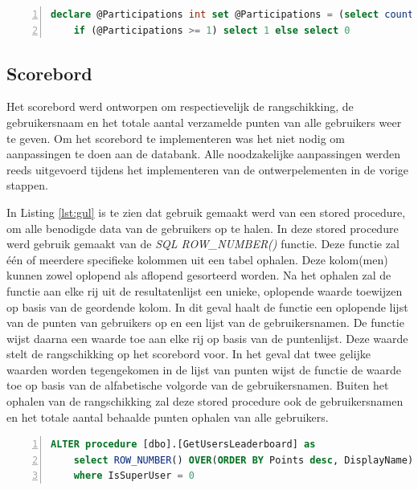 \begin{lstlisting}[caption={De trigger query van een badge.},
    label={lst:tq},
    language=SQL,
    showspaces=false,
    basicstyle=\ttfamily,
    numbers=left,
    numberstyle=\tiny,
    numbersep=1pt,
    breaklines=true
    commentstyle=\color{gray}]
    declare @Participations int set @Participations = (select count(*) from QuestionBot_Participations where UserID = @UserID) 
    if (@Participations >= 1) select 1 else select 0
\end{lstlisting}

\subsection{Scorebord}

Het scorebord werd ontworpen om respectievelijk de rangschikking, de gebruikersnaam en het totale aantal verzamelde punten van alle gebruikers weer te geven. Om het scorebord te implementeren was het niet nodig om aanpassingen te doen aan de databank. Alle noodzakelijke aanpassingen werden reeds uitgevoerd tijdens het implementeren van de ontwerpelementen in de vorige stappen.

In Listing \ref{lst:gul} is te zien dat gebruik gemaakt werd van een stored procedure, om alle benodigde data van de gebruikers op te halen. In deze stored procedure werd gebruik gemaakt van de \textit{SQL ROW\_NUMBER()} functie. Deze functie zal één of meerdere specifieke kolommen uit een tabel ophalen. Deze kolom(men) kunnen zowel oplopend als aflopend gesorteerd worden. Na het ophalen zal de functie aan elke rij uit de resultatenlijst een unieke, oplopende waarde toewijzen op basis van de geordende kolom. In dit geval haalt de functie een oplopende lijst van de punten van gebruikers op en een lijst van de gebruikersnamen. De functie wijst daarna een waarde toe aan elke rij op basis van de puntenlijst. Deze waarde stelt de rangschikking op het scorebord voor. In het geval dat twee gelijke waarden worden tegengekomen in de lijst van punten wijst de functie de waarde toe op basis van de alfabetische volgorde van de gebruikersnamen. Buiten het ophalen van de rangschikking zal deze stored procedure ook de gebruikersnamen en het totale aantal behaalde punten ophalen van alle gebruikers.

\begin{lstlisting}[caption={De GetUsersLeaderboard stored procedure.},
    label={lst:gul},
    language=SQL,
    showspaces=false,
    basicstyle=\ttfamily,
    numbers=left,
    numberstyle=\tiny,
    numbersep=1pt,
    breaklines=true
    commentstyle=\color{gray}]
    ALTER procedure [dbo].[GetUsersLeaderboard] as
    select ROW_NUMBER() OVER(ORDER BY Points desc, DisplayName) as Rank, DisplayName, Points from dbo.Users
    where IsSuperUser = 0
\end{lstlisting}

